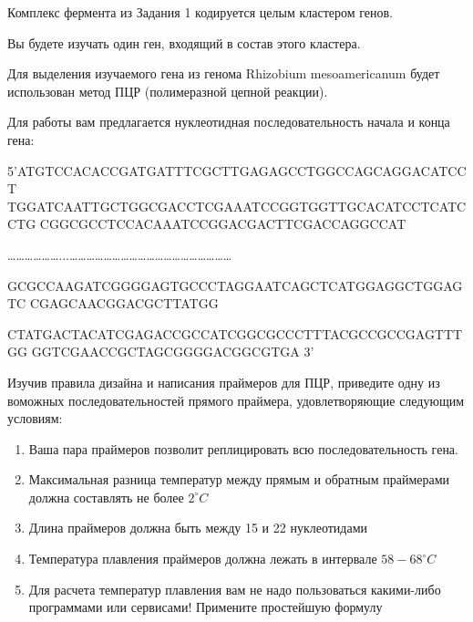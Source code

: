 
Комплекс фермента из Задания 1 кодируется целым кластером генов.

Вы будете изучать один ген, входящий в состав этого кластера.

Для выделения изучаемого гена из генома Rhizobium mesoamericanum будет использован метод ПЦР (полимеразной цепной реакции).

Для работы вам предлагается нуклеотидная последовательность начала и конца гена:

5’ATGTCCACACCGATGATTTCGCTTGAGAGCCTGGCCAGCAGGACATCCT\linebreak
TGGATCAATTGCTGGCGACCTCGAAATCCGGTGGTTGCACATCCTCATCCTG\linebreak
CGGCGCCTCCACAAATCCGGACGACTTCGACCAGGCCAT

………………...…………………………………………………

GCGCCAAGATCGGGGAGTGCCCTAGGAATCAGCTCATGGAGGCTGGAGTC\linebreak
CGAGCAACGGACGCTTATGG

CTATGACTACATCGAGACCGCCATCGGCGCCCTTTACGCCGCCGAGTTTGG\linebreak
GGTCGAACCGCTAGCGGGGACGGCGTGA 3’

Изучив правила дизайна и написания праймеров для ПЦР, приведите одну из воможных последовательностей прямого праймера, удовлетворяющие следующим условиям:

\begin{enumerate}
    \item Ваша пара праймеров позволит реплицировать всю последовательность гена.
    \item Максимальная разница температур между прямым и обратным праймерами должна составлять не более $2^{\circ}C$
    \item Длина праймеров должна быть между 15 и 22  нуклеотидами
    \item Температура плавления праймеров должна лежать в интервале $58-68^{\circ}C$
    \item Для расчета температур плавления вам не надо пользоваться какими-либо программами или сервисами! Примените простейшую формулу
\end{enumerate}

